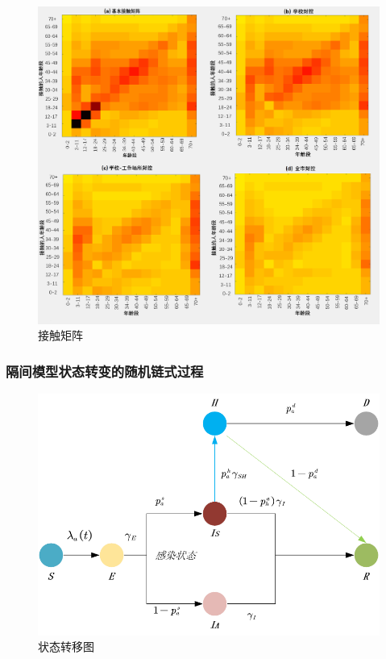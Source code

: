 \documentclass[bwprint]{gmcmthesis}
\numberwithin{figure}{section}
\begin{document}
\begin{figure}[!h]
\centering
\includegraphics[width=1\textwidth]{4CM.png}
\caption{接触矩阵}
\label{cm}
\end{figure}
%
%
%
\subsubsection{隔间模型状态转变的随机链式过程}
\begin{figure}[!h]
\centering
\includegraphics[width=.75\textwidth]{seirhd.png}
\caption{状态转移图}
\label{SLIRS}
\end{figure}
\end{document}
